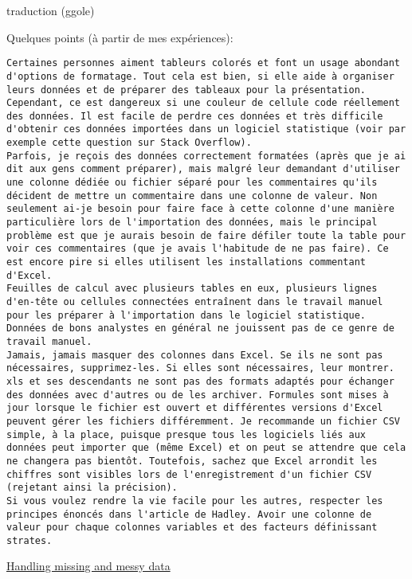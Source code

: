 \documentclass[]{article}
\begin{document}
traduction (ggole)

Quelques points (à partir de mes expériences):

\begin{verbatim}
Certaines personnes aiment tableurs colorés et font un usage abondant d'options de formatage. Tout cela est bien, si elle aide à organiser leurs données et de préparer des tableaux pour la présentation. Cependant, ce est dangereux si une couleur de cellule code réellement des données. Il est facile de perdre ces données et très difficile d'obtenir ces données importées dans un logiciel statistique (voir par exemple cette question sur Stack Overflow).
Parfois, je reçois des données correctement formatées (après que je ai dit aux gens comment préparer), mais malgré leur demandant d'utiliser une colonne dédiée ou fichier séparé pour les commentaires qu'ils décident de mettre un commentaire dans une colonne de valeur. Non seulement ai-je besoin pour faire face à cette colonne d'une manière particulière lors de l'importation des données, mais le principal problème est que je aurais besoin de faire défiler toute la table pour voir ces commentaires (que je avais l'habitude de ne pas faire). Ce est encore pire si elles utilisent les installations commentant d'Excel.
Feuilles de calcul avec plusieurs tables en eux, plusieurs lignes d'en-tête ou cellules connectées entraînent dans le travail manuel pour les préparer à l'importation dans le logiciel statistique. Données de bons analystes en général ne jouissent pas de ce genre de travail manuel.
Jamais, jamais masquer des colonnes dans Excel. Se ils ne sont pas nécessaires, supprimez-les. Si elles sont nécessaires, leur montrer.
xls et ses descendants ne sont pas des formats adaptés pour échanger des données avec d'autres ou de les archiver. Formules sont mises à jour lorsque le fichier est ouvert et différentes versions d'Excel peuvent gérer les fichiers différemment. Je recommande un fichier CSV simple, à la place, puisque presque tous les logiciels liés aux données peut importer que (même Excel) et on peut se attendre que cela ne changera pas bientôt. Toutefois, sachez que Excel arrondit les chiffres sont visibles lors de l'enregistrement d'un fichier CSV (rejetant ainsi la précision).
Si vous voulez rendre la vie facile pour les autres, respecter les principes énoncés dans l'article de Hadley. Avoir une colonne de valeur pour chaque colonnes variables et des facteurs définissant strates.
\end{verbatim}

\href{http://www.unomaha.edu/mahbubulmajumder/data-science/fall-2014/lectures/27-messy-data/27-messy-data.html\#/}{Handling
missing and messy data}
\end{document}
